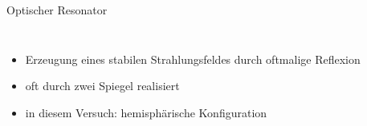 \documentclass[10pt, aspectratio=169]{beamer}
\begin{document}
\begin{frame}{Optischer Resonator}
  \begin{columns}
      
    \begin{itemize}
    \item<1-> Erzeugung eines stabilen Strahlungsfeldes durch
      oftmalige Reflexion
    \item<2-> oft durch zwei Spiegel realisiert
    \item<2-> in diesem Versuch: hemisph\"arische Konfiguration
    \end{itemize}
  \end{columns}
\end{frame}
\end{document}
